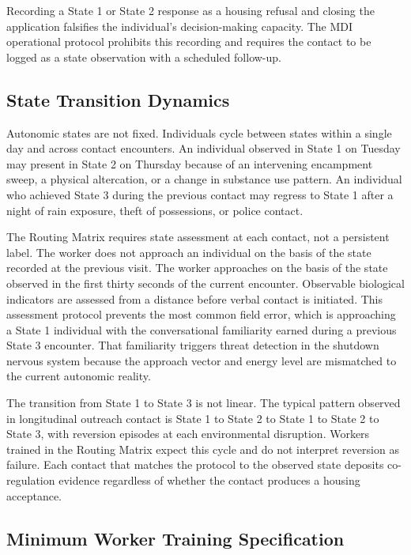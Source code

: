 \documentclass[12pt, letterpaper]{article}
\begin{document}
Recording a State 1 or State 2 response as a housing refusal and closing the application falsifies the individual's decision-making capacity. The MDI operational protocol prohibits this recording and requires the contact to be logged as a state observation with a scheduled follow-up.

\subsection{State Transition Dynamics}

Autonomic states are not fixed. Individuals cycle between states within a single day and across contact encounters. An individual observed in State 1 on Tuesday may present in State 2 on Thursday because of an intervening encampment sweep, a physical altercation, or a change in substance use pattern. An individual who achieved State 3 during the previous contact may regress to State 1 after a night of rain exposure, theft of possessions, or police contact.

The Routing Matrix requires state assessment at each contact, not a persistent label. The worker does not approach an individual on the basis of the state recorded at the previous visit. The worker approaches on the basis of the state observed in the first thirty seconds of the current encounter. Observable biological indicators are assessed from a distance before verbal contact is initiated. This assessment protocol prevents the most common field error, which is approaching a State 1 individual with the conversational familiarity earned during a previous State 3 encounter. That familiarity triggers threat detection in the shutdown nervous system because the approach vector and energy level are mismatched to the current autonomic reality.

The transition from State 1 to State 3 is not linear. The typical pattern observed in longitudinal outreach contact is State 1 to State 2 to State 1 to State 2 to State 3, with reversion episodes at each environmental disruption. Workers trained in the Routing Matrix expect this cycle and do not interpret reversion as failure. Each contact that matches the protocol to the observed state deposits co-regulation evidence regardless of whether the contact produces a housing acceptance.

\subsection{Minimum Worker Training Specification}
\end{document}
